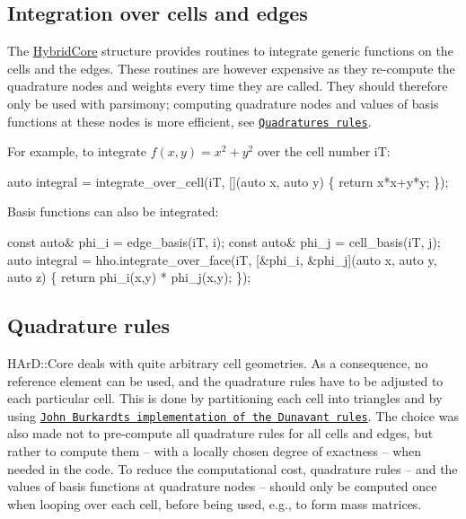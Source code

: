 \hypertarget{index_integrate_mesh}{}\subsection{Integration over cells and edges}\label{index_integrate_mesh}
The \hyperlink{classHArDCore2D_1_1HybridCore}{Hybrid\+Core} structure provides routines to integrate generic functions on the cells and the edges. These routines are however expensive as they re-\/compute the quadrature nodes and weights every time they are called. They should therefore only be used with parsimony; computing quadrature nodes and values of basis functions at these nodes is more efficient, see \href{#quad_rules}{\tt Quadratures rules}.

For example, to integrate $f(x,y) = x^2 + y^2 $ over the cell number iT\+:


\begin{DoxyCode}
\textcolor{keyword}{auto} integral = integrate\_over\_cell(iT, [](\textcolor{keyword}{auto} x, \textcolor{keyword}{auto} y) \{
        \textcolor{keywordflow}{return} x*x+y*y;
      \});
\end{DoxyCode}


Basis functions can also be integrated\+:


\begin{DoxyCode}
\textcolor{keyword}{const} \textcolor{keyword}{auto}& phi\_i = edge\_basis(iT, i);
\textcolor{keyword}{const} \textcolor{keyword}{auto}& phi\_j = cell\_basis(iT, j);
\textcolor{keyword}{auto} integral = hho.integrate\_over\_face(iT, [&phi\_i, &phi\_j](\textcolor{keyword}{auto} x, \textcolor{keyword}{auto} y, \textcolor{keyword}{auto} z) \{
  \textcolor{keywordflow}{return} phi\_i(x,y) * phi\_j(x,y);
\});
\end{DoxyCode}
\hypertarget{index_quad_rules}{}\subsection{Quadrature rules}\label{index_quad_rules}
H\+Ar\+D\+::\+Core deals with quite arbitrary cell geometries. As a consequence, no reference element can be used, and the quadrature rules have to be adjusted to each particular cell. This is done by partitioning each cell into triangles and by using \href{https://people.sc.fsu.edu/~jburkardt/cpp_src/triangle_dunavant_rule/triangle_dunavant_rule.html}{\tt John Burkardt\textquotesingle{}s implementation of the Dunavant rules}. The choice was also made not to pre-\/compute all quadrature rules for all cells and edges, but rather to compute them -- with a locally chosen degree of exactness -- when needed in the code. To reduce the computational cost, quadrature rules -- and the values of basis functions at quadrature nodes -- should only be computed once when looping over each cell, before being used, e.\+g., to form mass matrices.

